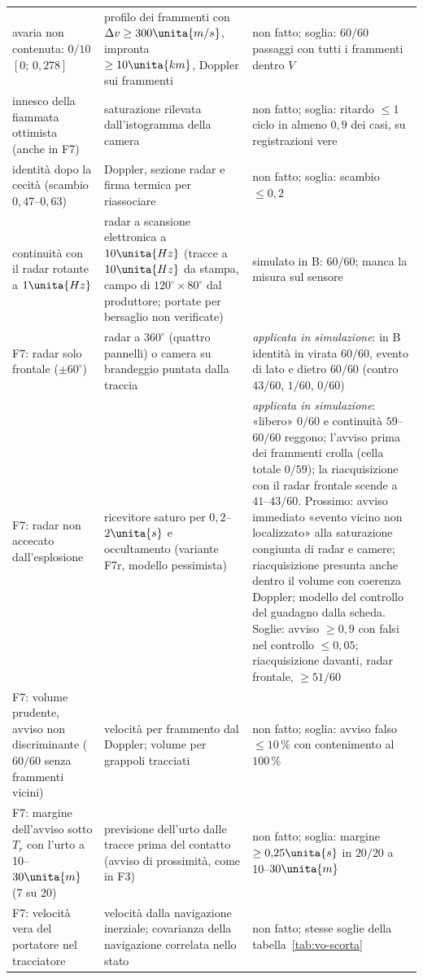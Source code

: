 {\begin{longtable}{@{}>{\RaggedRight\arraybackslash}p{3.3cm}>{\RaggedRight\arraybackslash}p{5.6cm}>{\RaggedRight\arraybackslash}p{5.8cm}@{}}
avaria non contenuta: $0/10$ $[0;\,0{,}278]$ & profilo dei frammenti con $\Delta v\ge300\unita{m/s}$, impronta $\ge10\unita{km}$, Doppler sui frammenti & non fatto; soglia: $60/60$ passaggi con tutti i frammenti dentro $V$\\
innesco della fiammata ottimista (anche in F7) & saturazione rilevata dall'istogramma della camera & non fatto; soglia: ritardo $\le1$ ciclo in almeno $0{,}9$ dei casi, su registrazioni vere\\
identità dopo la cecità (scambio $0{,}47$--$0{,}63$) & Doppler, sezione radar e firma termica per riassociare & non fatto; soglia: scambio $\le0{,}2$\\
continuità con il radar rotante a $1\unita{Hz}$ & radar a scansione elettronica a $10\unita{Hz}$ (tracce a $10\unita{Hz}$ da stampa, campo di $120^\circ\times80^\circ$ dal produttore; portate per bersaglio non verificate) & simulato in B: $60/60$; manca la misura sul sensore\\
F7: radar solo frontale ($\pm60^\circ$) & radar a $360^\circ$ (quattro pannelli) o camera su brandeggio puntata dalla traccia & \emph{applicata in simulazione}: in B identità in virata $60/60$, evento di lato e dietro $60/60$ (contro $43/60$, $1/60$, $0/60$)\\
F7: radar non accecato dall'esplosione & ricevitore saturo per $0{,}2$--$2\unita{s}$ e occultamento (variante F7r, modello pessimista) & \emph{applicata in simulazione}: «libero» $0/60$ e continuità $59$--$60/60$ reggono; l'avviso prima dei frammenti crolla (cella totale $0/59$); la riacquisizione con il radar frontale scende a $41$--$43/60$. Prossimo: avviso immediato «evento vicino non localizzato» alla saturazione congiunta di radar e camere; riacquisizione presunta anche dentro il volume con coerenza Doppler; modello del controllo del guadagno dalla scheda. Soglie: avviso $\ge0{,}9$ con falsi nel controllo $\le0{,}05$; riacquisizione davanti, radar frontale, $\ge51/60$\\
F7: volume prudente, avviso non discriminante ($60/60$ senza frammenti vicini) & velocità per frammento dal Doppler; volume per grappoli tracciati & non fatto; soglia: avviso falso $\le10\,\%$ con contenimento al $100\,\%$\\
F7: margine dell'avviso sotto $T_r$ con l'urto a 10--$30\unita{m}$ (7 su 20) & previsione dell'urto dalle tracce prima del contatto (avviso di prossimità, come in F3) & non fatto; soglia: margine $\ge0{,}25\unita{s}$ in $20/20$ a 10--$30\unita{m}$\\
F7: velocità vera del portatore nel tracciatore & velocità dalla navigazione inerziale; covarianza della navigazione correlata nello stato & non fatto; stesse soglie della tabella~\ref{tab:vo-scorta}\\

\end{longtable}}
